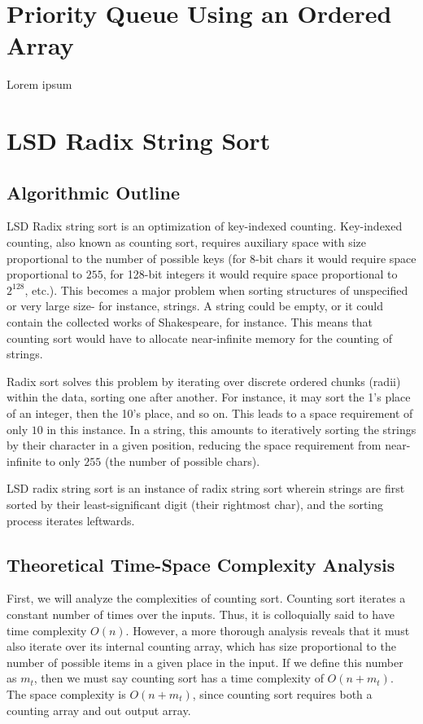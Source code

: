 \documentclass[12pt]{amsart}
\begin{document}
\section{Priority Queue Using an Ordered Array}
    Lorem ipsum

\section{LSD Radix String Sort}

    \subsection{Algorithmic Outline}

    LSD Radix string sort is an optimization of key-indexed
    counting. Key-indexed counting, also known as counting sort,
    requires auxiliary space with size proportional to the
    number of possible keys (for 8-bit chars it would require
    space proportional to $255$, for 128-bit integers it would
    require space proportional to $2^{128}$, etc.). This
    becomes a major problem when sorting structures of
    unspecified or very large size- for instance, strings. A
    string could be empty, or it could contain the collected
    works of Shakespeare, for instance. This means that counting
    sort would have to allocate near-infinite memory for the
    counting of strings.
    
    Radix sort solves this problem by iterating over discrete
    ordered chunks (radii) within the data, sorting one after
    another. For instance, it may sort the 1's place of an
    integer, then the 10's place, and so on. This leads to a
    space requirement of only $10$ in this instance. In a
    string, this amounts to iteratively sorting the strings by
    their character in a given position, reducing the space
    requirement from near-infinite to only $255$ (the number of
    possible chars).

    LSD radix string sort is an instance of radix string sort
    wherein strings are first sorted by their least-significant
    digit (their rightmost char), and the sorting process
    iterates leftwards.

    \subsection{Theoretical Time-Space Complexity Analysis}

    First, we will analyze the complexities of counting sort.
    Counting sort iterates a constant number of times over the
    inputs. Thus, it is colloquially said to have time
    complexity $O(n)$. However, a more thorough analysis reveals
    that it must also iterate over its internal counting array,
    which has size proportional to the number of possible items
    in a given place in the input. If we define this number as
    $m_t$, then we must say counting sort has a time complexity of
    $O(n + m_t)$. The space complexity is $O(n + m_t)$, since
    counting sort requires both a counting array and out output
    array.
\end{document}
